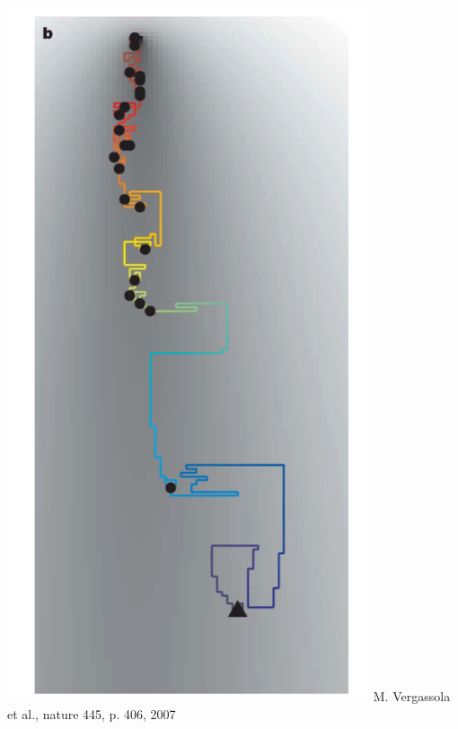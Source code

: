 \documentclass[11pt]{beamer}
\begin{document}
\begin{frame}
\begin{minipage}[h]{0.35\textwidth}
  \includegraphics[width=0.8\textwidth]{gfx/infotaxis.png}
  {\newline\tiny M. Vergassola et al., nature 445, p. 406, 2007}
 \end{minipage}
\end{frame}
\end{document}
